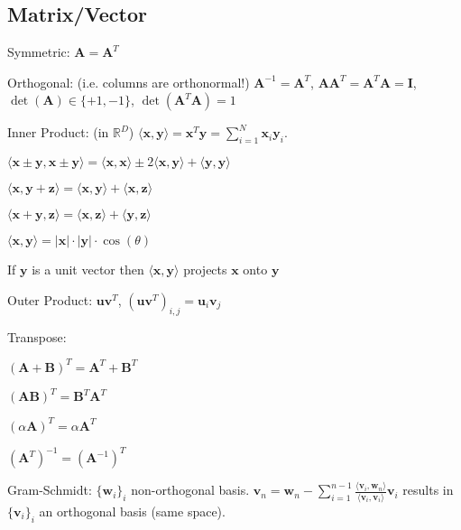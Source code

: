 \documentclass[a4paper, 11pt, landscape]{article}
\begin{document}
\begin{multicols*}{3}
\section{Matrix/Vector}
\begin{compactdesc}
	\item[Symmetric:] $\mathbf{A} = \mathbf{A}^T$
	\item[Orthogonal:] (i.e. columns are orthonormal!) $\mathbf{A}^{-1} = \mathbf{A}^T$, $\mathbf{A} \mathbf{A}^T = \mathbf{A}^T \mathbf{A} = \mathbf{I}$, $\operatorname{det}(\mathbf{A}) \in \{+1, -1\}$, $\operatorname{det}(\mathbf{A}^T \mathbf{A}) = 1$
	\item[Inner Product:] (in $\mathbb{R}^D$) $\langle \mathbf{x}, \mathbf{y} \rangle = \mathbf{x}^T \mathbf{y} = \sum_{i=1}^{N} \mathbf{x}_i \mathbf{y}_i$.
	\begin{inparaitem}[\color{red}\textbullet]
		\item $\langle \mathbf{x} \pm \mathbf{y}, \mathbf{x} \pm \mathbf{y} \rangle = \langle \mathbf{x}, \mathbf{x} \rangle \pm 2 \langle \mathbf{x}, \mathbf{y} \rangle + \langle \mathbf{y}, \mathbf{y} \rangle$
		\item $\langle \mathbf{x}, \mathbf{y} + \mathbf{z} \rangle = \langle \mathbf{x}, \mathbf{y} \rangle + \langle \mathbf{x}, \mathbf{z} \rangle$
		\item $\langle \mathbf{x} + \mathbf{y}, \mathbf{z} \rangle = \langle \mathbf{x}, \mathbf{z} \rangle + \langle \mathbf{y}, \mathbf{z} \rangle$
		\item $\langle \mathbf{x}, \mathbf{y} \rangle = |\mathbf{x}| \cdot |\mathbf{y}| \cdot \cos(\theta)$
		\item If $\mathbf{y}$ is a unit vector then $\langle \mathbf{x}, \mathbf{y} \rangle$ projects $\mathbf{x}$ onto $\mathbf{y}$
	\end{inparaitem}
	\item[Outer Product:] $\mathbf{u} \mathbf{v}^T$, $(\mathbf{u} \mathbf{v}^T)_{i, j} = \mathbf{u}_i \mathbf{v}_j$
	\item[Transpose:]
		\begin{inparaitem}[\color{red}\textbullet]
			\item $(\mathbf{A} + \mathbf{B})^T = \mathbf{A}^T + \mathbf{B}^T$
			\item $(\mathbf{A}\mathbf{B})^T = \mathbf{B}^T \mathbf{A}^T$
			\item $(\alpha \mathbf{A})^T = \alpha \mathbf{A}^T$
			\item $(\mathbf{A}^T)^{-1} = (\mathbf{A}^{-1})^T$
		\end{inparaitem}
	\item[Gram-Schmidt:] $\{\mathbf{w}_i\}_i$ non-orthogonal basis. $\mathbf{v}_n = \mathbf{w}_n - \sum_{i=1}^{n-1} \frac{\langle \mathbf{v}_i, \mathbf{w}_n \rangle}{\langle \mathbf{v}_i, \mathbf{v}_i \rangle} \mathbf{v}_i$ results in $\{\mathbf{v}_i\}_i$ an orthogonal basis (same space).
\end{compactdesc}


\end{multicols*}
\end{document}
